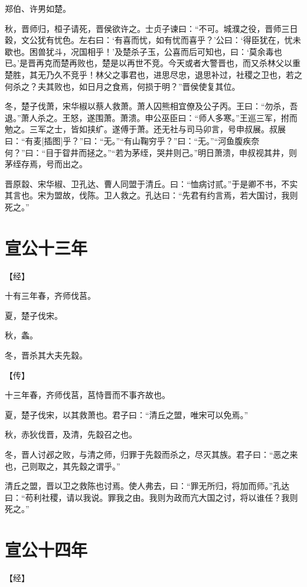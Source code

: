 \documentclass[a4paper,12pt,UTF8,twoside]{ctexbook}
\begin{document}
郑伯、许男如楚。

秋，晋师归，桓子请死，晋侯欲许之。士贞子谏曰：“不可。城濮之役，晋师三日穀，文公犹有忧色。左右曰：‘有喜而忧，如有忧而喜乎？’公曰：‘得臣犹在，忧未歇也。困兽犹斗，况国相乎！’及楚杀子玉，公喜而后可知也，曰：‘莫余毒也已。’是晋再克而楚再败也，楚是以再世不竞。今天或者大警晋也，而又杀林父以重楚胜，其无乃久不竞乎！林父之事君也，进思尽忠，退思补过，社稷之卫也，若之何杀之？夫其败也，如日月之食焉，何损于明？”晋侯使复其位。

冬，楚子伐萧，宋华椒以蔡人救萧。萧人囚熊相宜僚及公子丙。王曰：“勿杀，吾退。”萧人杀之。王怒，遂围萧。萧溃。申公巫臣曰：“师人多寒。”王巡三军，拊而勉之。三军之士，皆如挟纩。遂傅于萧。还无社与司马卯言，号申叔展。叔展曰：“有麦[插图]乎？”曰：“无。”“有山鞠穷乎？”曰：“无。”“河鱼腹疾奈何？”曰：“目于眢井而拯之。”“若为茅绖，哭井则己。”明日萧溃，申叔视其井，则茅绖存焉，号而出之。

晋原縠、宋华椒、卫孔达、曹人同盟于清丘。曰：“恤病讨贰。”于是卿不书，不实其言也。宋为盟故，伐陈。卫人救之。孔达曰：“先君有约言焉，若大国讨，我则死之。”

\section{宣公十三年}




【经】

十有三年春，齐师伐莒。

夏，楚子伐宋。

秋，螽。

冬，晋杀其大夫先縠。

【传】

十三年春，齐师伐莒，莒恃晋而不事齐故也。

夏，楚子伐宋，以其救萧也。君子曰：“清丘之盟，唯宋可以免焉。”

秋，赤狄伐晋，及清，先縠召之也。

冬，晋人讨邲之败，与清之师，归罪于先縠而杀之，尽灭其族。君子曰：“恶之来也，己则取之，其先縠之谓乎。”

清丘之盟，晋以卫之救陈也讨焉。使人弗去，曰：“罪无所归，将加而师。”孔达曰：“苟利社稷，请以我说。罪我之由。我则为政而亢大国之讨，将以谁任？我则死之。”


\section{宣公十四年}



【经】
\end{document}
